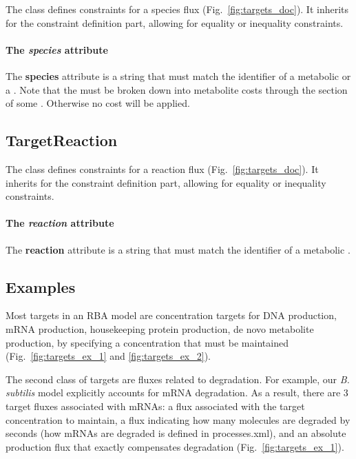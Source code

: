The \targetspecies{} class defines constraints for a species flux
(Fig.~\ref{fig:targets_doc}).
It inherits \targetvalue{} for the constraint definition part, allowing for
equality or inequality constraints.

\paragraph{The \textit{species} attribute}
The \textbf{species} attribute is a string that must match the identifier
of a metabolic \species{} or a \macromolecule{}.
Note that the \macromolecule{} must be broken down into metabolite costs
through the \processings{} section of some \process{}.
Otherwise no cost will be applied.


\subsection{TargetReaction}
\label{sec:target_reaction}

The \targetreaction{} class defines constraints for a reaction flux
(Fig.~\ref{fig:targets_doc}).
It inherits \targetvalue{} for the constraint definition part, allowing for
equality or inequality constraints.

\paragraph{The \textit{reaction} attribute}
The \textbf{reaction} attribute is a string that must match the identifier
of a metabolic \reaction{}.

\subsection{Examples}

Most targets in an RBA model are concentration targets for DNA production,
mRNA production, housekeeping protein production, de novo metabolite
production, by specifying a concentration that must be maintained
(Fig.~\ref{fig:targets_ex_1} and \ref{fig:targets_ex_2}).

The second class of targets are fluxes related to degradation.
For example, our \textit{B. subtilis} model explicitly accounts for mRNA
degradation.
As a result, there are 3 target fluxes associated with mRNAs:
a flux associated with the target concentration to maintain,
a flux indicating how many molecules are degraded by seconds
(how mRNAs are degraded is defined in processes.xml),
and an absolute production flux that exactly compensates degradation
(Fig.~\ref{fig:targets_ex_1}).

